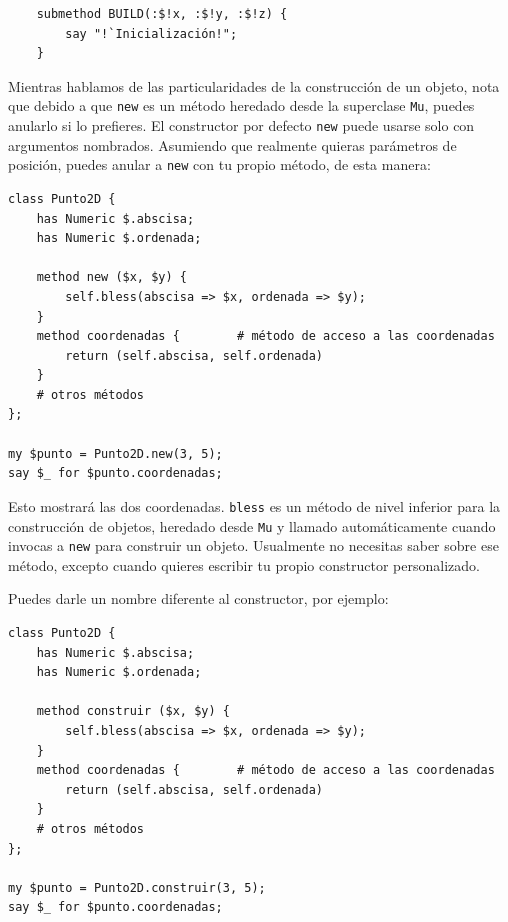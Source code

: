 \begin{lstlisting}
    submethod BUILD(:$!x, :$!y, :$!z) {
        say "!`Inicialización!";
    }
\end{lstlisting}


Mientras hablamos de las particularidades de la construcción de un objeto,
nota que debido a que {\tt new} es un método heredado desde la superclase
{\tt Mu}, puedes anularlo si lo prefieres. El constructor por defecto
{\tt new} puede usarse solo con argumentos nombrados. Asumiendo que realmente
quieras parámetros de posición, puedes anular a {\tt new} con tu 
propio método, de esta manera:

\begin{lstlisting}
class Punto2D {
    has Numeric $.abscisa;
    has Numeric $.ordenada;

    method new ($x, $y) {
        self.bless(abscisa => $x, ordenada => $y);
    }
    method coordenadas {        # método de acceso a las coordenadas
        return (self.abscisa, self.ordenada)
    }
    # otros métodos
};

my $punto = Punto2D.new(3, 5);
say $_ for $punto.coordenadas;
\end{lstlisting}

Esto mostrará las dos coordenadas. {\tt bless} es un método
de nivel inferior para la construcción de objetos, heredado
desde {\tt Mu} y llamado automáticamente cuando invocas a {\tt new}
para construir un objeto. Usualmente no necesitas saber sobre 
ese método, excepto cuando quieres escribir tu propio
constructor personalizado.

Puedes darle un nombre diferente al constructor, por ejemplo:

\begin{lstlisting}
class Punto2D {
    has Numeric $.abscisa;
    has Numeric $.ordenada;

    method construir ($x, $y) {
        self.bless(abscisa => $x, ordenada => $y);
    }
    method coordenadas {        # método de acceso a las coordenadas
        return (self.abscisa, self.ordenada)
    }
    # otros métodos
};

my $punto = Punto2D.construir(3, 5);
say $_ for $punto.coordenadas;
\end{lstlisting}

